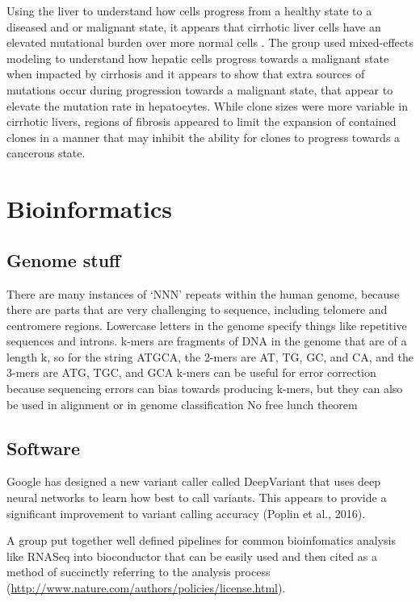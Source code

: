 \documentclass[]{book}
\begin{document}
Using the liver to understand how cells progress from a healthy state to a diseased and or malignant state, it appears that cirrhotic liver cells have an elevated mutational burden over more normal cells \citep{brunner2019somatic}. The group used mixed-effects modeling to understand how hepatic cells progress towards a malignant state when impacted by cirrhosis and it appears to show that extra sources of mutations occur during progression towards a malignant state, that appear to elevate the mutation rate in hepatocytes. While clone sizes were more variable in cirrhotic livers, regions of fibrosis appeared to limit the expansion of contained clones in a manner that may inhibit the ability for clones to progress towards a cancerous state.

\hypertarget{bioinformatics}{%
\chapter{Bioinformatics}\label{bioinformatics}}

\hypertarget{genome-stuff}{%
\section{Genome stuff}\label{genome-stuff}}

There are many instances of `NNN' repeats within the human genome, because there are parts that are very challenging to sequence, including telomere and centromere regions.
Lowercase letters in the genome specify things like repetitive sequences and introns.
k-mers are fragments of DNA in the genome that are of a length k, so for the string ATGCA, the 2-mers are AT, TG, GC, and CA, and the 3-mers are ATG, TGC, and GCA
k-mers can be useful for error correction because sequencing errors can bias towards producing k-mers, but they can also be used in alignment or in genome classification
No free lunch theorem

\hypertarget{software}{%
\section{Software}\label{software}}

Google has designed a new variant caller called DeepVariant that uses deep neural networks to learn how best to call variants. This appears to provide a significant improvement to variant calling accuracy (Poplin et al., 2016).

A group put together well defined pipelines for common bioinfomatics analysis like RNASeq into bioconductor that can be easily used and then cited as a method of succinctly referring to the analysis process (\url{http://www.nature.com/authors/policies/license.html}).
\end{document}
